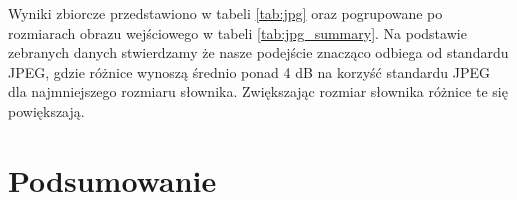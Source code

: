 \documentclass{article}
\begin{document}
Wyniki zbiorcze przedstawiono w tabeli \ref{tab:jpg} oraz pogrupowane po rozmiarach obrazu wejściowego w tabeli \ref{tab:jpg_summary}. Na podstawie zebranych danych stwierdzamy że nasze podejście znacząco odbiega od standardu JPEG, gdzie różnice wynoszą średnio ponad 4 dB na korzyść standardu JPEG dla najmniejszego rozmiaru słownika. Zwiększając rozmiar słownika różnice te się powiększają.

\section{Podsumowanie}

\lipsum[1-3]


\end{document}
